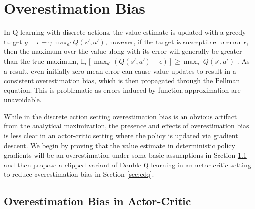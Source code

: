 \documentclass{article}
\newcommand{\e}{\epsilon}
\newcommand{\y}{\gamma}
\newcommand{\E}{\mathbb{E}}
\begin{document}
\section{Overestimation Bias} \label{sec:over}

In Q-learning with discrete actions, the value estimate is updated with a greedy target $y = r + \y \max_{a'} Q(s',a')$, however, if the target is susceptible to error $\e$, then the maximum over the value along with its error will generally be greater than the true maximum, $\E_\e[\max_{a'} (Q(s',a') + \e)] \geq \max_{a'} Q(s',a')$ \cite{thrun1993bias}. As a result, even initially zero-mean error can cause value updates to result in a consistent overestimation bias, which is then propagated through the Bellman equation. This is problematic as errors induced by function approximation are unavoidable. 

While in the discrete action setting overestimation bias is an obvious artifact from the analytical maximization, the presence and effects of overestimation bias is less clear in an actor-critic setting where the policy is updated via gradient descent. We begin by proving that the value estimate in deterministic policy gradients will be an overestimation under some basic assumptions in Section \ref{sec:overac} and then propose a clipped variant of Double Q-learning in an actor-critic setting to reduce overestimation bias in Section \ref{sec:cdq}. 

\subsection{Overestimation Bias in Actor-Critic} \label{sec:overac}
\end{document}
